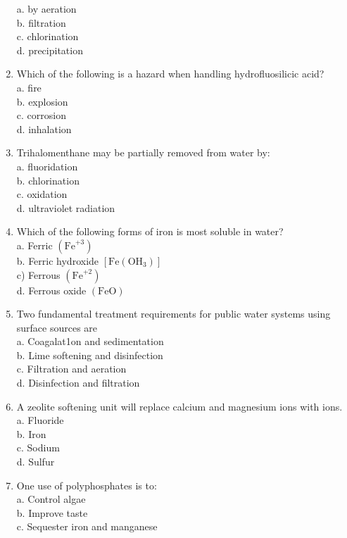 \begin{enumerate}
a. by aeration\\
b. filtration\\
c. chlorination\\
d. precipitation\\
\item Which of the following is a hazard when handling hydrofluosilicic acid?\\
a. fire\\
b. explosion\\
c. corrosion\\
d. inhalation\\
\item Trihalomenthane may be partially removed from water by:\\
a. fluoridation\\
b. chlorination\\
c. oxidation\\
d. ultraviolet radiation\\
\item Which of the following forms of iron is most soluble in water?\\
a. Ferric $\left(\mathrm{Fe}^{+3}\right)$\\
b. Ferric hydroxide $\left[\mathrm{Fe}\left(\mathrm{OH}_{3}\right)\right]$\\
c) Ferrous $\left(\mathrm{Fe}^{+2}\right)$\\
d. Ferrous oxide $(\mathrm{FeO})$\\
\item Two fundamental treatment requirements for public water systems using surface sources are\\
a. Coagalat1on and sedimentation\\
b. Lime softening and disinfection\\
c. Filtration and aeration\\
d. Disinfection and filtration\\
\item A zeolite softening unit will replace calcium and magnesium ions with ions.\\
a. Fluoride\\
b. Iron\\
c. Sodium\\
d. Sulfur\\
\item One use of polyphosphates is to:\\
a. Control algae\\
b. Improve taste\\
c. Sequester iron and manganese\\

\end{enumerate}
